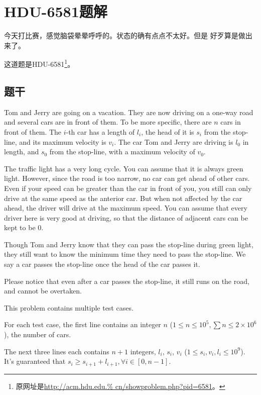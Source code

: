 

\section{HDU-6581题解}

今天打比赛，感觉脑袋晕晕呼呼的。状态的确有点点不太好。但是
好歹算是做出来了。

这道题是HDU-6581\footnote{原网址是\url{http://acm.hdu.edu.%
cn/showproblem.php?pid=6581}。}。

\subsection{题干}
Tom and Jerry are going on a vacation. They are now
driving on a one-way road and several cars are in
front of them. To be more specific, there are $n$ cars
in front of them. The $i$-th car has a length of $l_i$,
the head of it is $s_i$ from the stop-line, and its
maximum velocity is $v_i$. The car Tom and Jerry are
driving is $l_0$ in length, and $s_0$ from the stop-line,
with a maximum velocity of $v_0$.

The traffic light has a very long cycle. You can assume
that it is always green light. However, since the road
is too narrow, no car can get ahead of other cars. Even
if your speed can be greater than the car in front of
you, you still can only drive at the same speed as the
anterior car. But when not affected by the car ahead,
the driver will drive at the maximum speed. You can
assume that every driver here is very good at driving,
so that the distance of adjacent cars can be kept to be 0.

Though Tom and Jerry know that they can pass the
stop-line during green light, they still want to know
the minimum time they need to pass the stop-line. We
say a car passes the stop-line once the head of the car
passes it.

Please notice that even after a car passes the stop-line,
it still runs on the road, and cannot be overtaken.

This problem contains multiple test cases.

For each test case, the first line contains an integer
$n$ ($1\le n\le 10^5,\sum n\le 2\times 10^6$), the number
of cars.

The next three lines each contains $n+1$ integers, $l_i$,
$s_i$, $v_i$ ($1\le s_i,v_i,l_i\le 10^9$). It's guaranteed
that $s_i\ge s_{i+1}+l_{i+1},\forall i\in[0,n−1]$.

